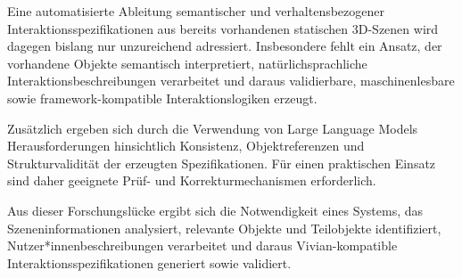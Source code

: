 Eine automatisierte Ableitung semantischer und verhaltensbezogener Interaktionsspezifikationen aus bereits vorhandenen statischen 3D-Szenen wird dagegen bislang nur unzureichend adressiert. Insbesondere fehlt ein Ansatz, der vorhandene Objekte semantisch interpretiert, natürlichsprachliche Interaktionsbeschreibungen verarbeitet und daraus validierbare, maschinenlesbare sowie framework-kompatible Interaktionslogiken erzeugt.

Zusätzlich ergeben sich durch die Verwendung von Large Language Models Herausforderungen hinsichtlich Konsistenz, Objektreferenzen und Strukturvalidität der erzeugten Spezifikationen. Für einen praktischen Einsatz sind daher geeignete Prüf- und Korrekturmechanismen erforderlich.

Aus dieser Forschungslücke ergibt sich die Notwendigkeit eines Systems, das Szeneninformationen analysiert, relevante Objekte und Teilobjekte identifiziert, Nutzer*innenbeschreibungen verarbeitet und daraus Vivian-kompatible Interaktionsspezifikationen generiert sowie validiert.
